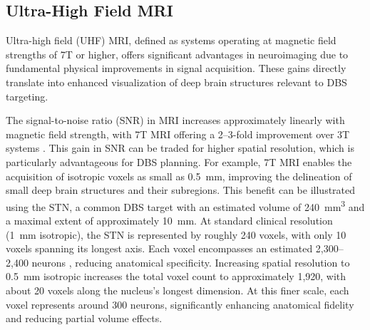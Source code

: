 \subsection{Ultra-High Field MRI}
\label{sec:uhf_mri_physics}

Ultra-high field (UHF) MRI, defined as systems operating at magnetic field strengths of 7T or higher, offers significant advantages in neuroimaging due to fundamental physical improvements in signal acquisition. These gains directly translate into enhanced visualization of deep brain structures relevant to DBS targeting.

The signal-to-noise ratio (SNR) in MRI increases approximately linearly with magnetic field strength, with 7T MRI offering a 2--3-fold improvement over 3T systems \cite{Trampel2019-fa}. This gain in SNR can be traded for higher spatial resolution, which is particularly advantageous for DBS planning. For example, 7T MRI enables the acquisition of isotropic voxels as small as 0.5~mm, improving the delineation of small deep brain structures and their subregions. This benefit can be illustrated using the STN, a common DBS target with an estimated volume of 240~mm\textsuperscript{3} and a maximal extent of approximately 10~mm. At standard clinical resolution (1~mm isotropic), the STN is represented by roughly 240 voxels, with only 10 voxels spanning its longest axis. Each voxel encompasses an estimated 2,300--2,400 neurons \cite{Hamani2004-zr,Hardman2002-ru}, reducing anatomical specificity. Increasing spatial resolution to 0.5~mm isotropic increases the total voxel count to approximately 1,920, with about 20 voxels along the nucleus’s longest dimension. At this finer scale, each voxel represents around 300 neurons, significantly enhancing anatomical fidelity and reducing partial volume effects.

